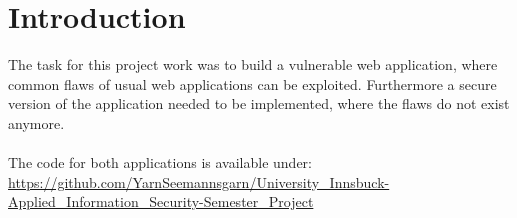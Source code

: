 \section{Introduction}

The task for this project work was to build a vulnerable web application, where common flaws of usual web applications can be exploited. Furthermore a secure version of the application needed to be implemented, where the flaws do not exist anymore.\\
\\
The code for both applications is available under:\\
\href{https://github.com/YarnSeemannsgarn/University_Innsbuck-Applied_Information_Security-Semester_Project}{https://git\allowbreak{}hub.\allowbreak{}com/\allowbreak{}Yarn\allowbreak{}Seemannsgarn/\allowbreak{}Uni\allowbreak{}ver\allowbreak{}si\allowbreak{}ty\_\allowbreak{}Inns\allowbreak{}buck-\allowbreak{}Applied\_\allowbreak{}In\allowbreak{}for\allowbreak{}ma\allowbreak{}tion\_\allowbreak{}Security-\allowbreak{}Se\allowbreak{}mes\allowbreak{}ter\_\allowbreak{}Pro\allowbreak{}ject}
